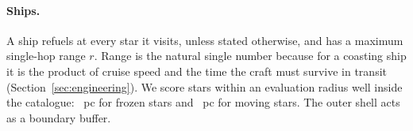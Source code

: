 \paragraph{Ships.} A ship refuels at every star it visits, unless stated
otherwise, and has a maximum single-hop range $r$. Range is the natural single
number because for a coasting ship it is the product of cruise speed and the
time the craft must survive in transit (Section~\ref{sec:engineering}). We
score stars within an evaluation radius well inside the catalogue: \EvalRadius~pc
for frozen stars and \TdEval~pc for moving stars. The outer shell acts as a
boundary buffer.
